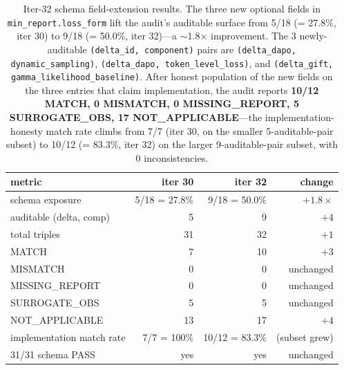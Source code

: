 \documentclass{article}
\begin{document}
\begin{table}[t]
\centering\small
\caption{Iter-32 schema field-extension results. The three new optional
fields in \texttt{min\_report.loss\_form} lift the audit's auditable
surface from 5/18 (= 27.8\%, iter 30) to 9/18 (= 50.0\%, iter 32)---a
$\sim$1.8$\times$ improvement. The 3 newly-auditable
\texttt{(delta\_id, component)} pairs are
\texttt{(delta\_dapo, dynamic\_sampling)},
\texttt{(delta\_dapo, token\_level\_loss)}, and
\texttt{(delta\_gift, gamma\_likelihood\_baseline)}. After honest
population of the new fields on the three entries that claim
implementation, the audit reports \textbf{10/12 MATCH, 0 MISMATCH, 0
MISSING\_REPORT, 5 SURROGATE\_OBS, 17 NOT\_APPLICABLE}---the
implementation-honesty match rate climbs from 7/7 (iter 30, on the
smaller 5-auditable-pair subset) to 10/12 (= 83.3\%, iter 32) on the
larger 9-auditable-pair subset, with 0 inconsistencies.}
\label{tab:p6-schema-extension}
\begin{tabular}{l r r r}
\toprule
metric & iter 30 & iter 32 & change \\
\midrule
schema exposure           & 5/18 = 27.8\% & 9/18 = 50.0\% & $+1.8\times$ \\
auditable (delta, comp)   & 5             & 9             & $+4$ \\
total triples             & 31            & 32            & $+1$ \\
MATCH                     & 7             & 10            & $+3$ \\
MISMATCH                  & 0             & 0             & unchanged \\
MISSING\_REPORT           & 0             & 0             & unchanged \\
SURROGATE\_OBS            & 5             & 5             & unchanged \\
NOT\_APPLICABLE           & 13            & 17            & $+4$ \\
implementation match rate & 7/7 = 100\%   & 10/12 = 83.3\% & (subset grew) \\
31/31 schema PASS        & yes           & yes           & unchanged \\
\bottomrule
\end{tabular}
\end{table}
\end{document}

